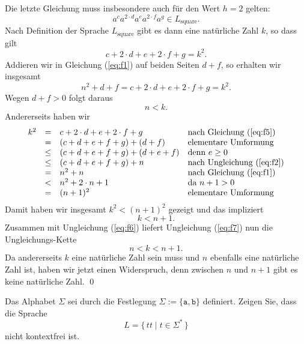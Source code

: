 Die letzte Gleichung muss insbesondere auch f\"ur den Wert $h=2$ gelten:
\[ a^ca^{2\cdot d}a^ea^{2\cdot f}a^g \in L_{\mathrm{square}}.  \]
Nach Definition der Sprache $L_{\mathrm{square}}$ gibt es dann eine nat\"urliche Zahl
$k$, so dass gilt
\begin{equation}
  \label{eq:f5}
  c + 2\cdot d + e + 2\cdot f + g = k^2.
\end{equation}
Addieren wir in Gleichung (\ref{eq:f1}) auf beiden Seiten $d+f$, so erhalten wir insgesamt
\[ n^2 + d + f = c + 2\cdot d + e + 2\cdot f + g = k^2. \]
Wegen $d + f > 0$ folgt daraus 
\begin{equation}
  \label{eq:f6}
  n < k.    
\end{equation}
Andererseits haben wir
\[ 
\begin{array}[t]{lcll}
 k^2  & =    & c + 2\cdot d + e + 2\cdot f + g   & \mbox{nach Gleichung (\ref{eq:f5}})   \\
      & =    & (c + d + e + f + g) + (d + f)     & \mbox{elementare Umformung}           \\
      & \leq & (c + d + e + f + g) + (d + e + f) & \mbox{denn $e \geq 0$}                \\
      & \leq & (c + d + e + f + g) + n           & \mbox{nach Ungleichung (\ref{eq:f2}}) \\
      & =    & n^2 + n                           & \mbox{nach Gleichung (\ref{eq:f1}})   \\
      & <    & n^2 + 2 \cdot n + 1               & \mbox{da $n+1 > 0$}                   \\ 
      & =    & (n+1)^2                           & \mbox{elementare Umformung}           \\ 
\end{array}
\]
Damit haben wir insgesamt  $k^2 < (n+1)^2$ gezeigt und das impliziert
\begin{equation}
  \label{eq:f7}
  k < n+1.
\end{equation}
Zusammen mit Ungleichung (\ref{eq:f6}) liefert Ungleichung (\ref{eq:f7}) nun die Ungleichungs-Kette
\[ n < k < n + 1. \]
Da andererseits $k$ eine nat\"urliche Zahl sein muss und $n$ ebenfalls eine nat\"urliche Zahl ist,
haben wir jetzt einen Widerspruch, denn zwischen $n$ und $n+1$ gibt es keine nat\"urliche Zahl.
\qed


\exercise
Das Alphabet $\Sigma$ sei durch die Festlegung $\Sigma := \{ \mathtt{a}, \mathtt{b} \}$
definiert.  Zeigen Sie, dass die Sprache 
\[ L = \bigl\{ \, tt \;\big|\; t \in \Sigma^*\, \bigr\} \]
nicht kontextfrei ist. \eox

